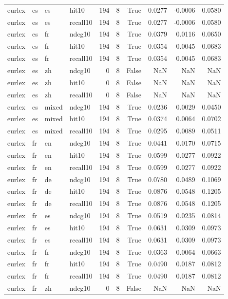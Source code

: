 \begin{tabular}{llllrrrrrr}
eurlex & es & es & hit10 & 194 & 8 & True & 0.0277 & -0.0006 & 0.0580 \\
eurlex & es & es & recall10 & 194 & 8 & True & 0.0277 & -0.0006 & 0.0580 \\
eurlex & es & fr & ndcg10 & 194 & 8 & True & 0.0379 & 0.0116 & 0.0650 \\
eurlex & es & fr & hit10 & 194 & 8 & True & 0.0354 & 0.0045 & 0.0683 \\
eurlex & es & fr & recall10 & 194 & 8 & True & 0.0354 & 0.0045 & 0.0683 \\
eurlex & es & zh & ndcg10 & 0 & 8 & False & NaN & NaN & NaN \\
eurlex & es & zh & hit10 & 0 & 8 & False & NaN & NaN & NaN \\
eurlex & es & zh & recall10 & 0 & 8 & False & NaN & NaN & NaN \\
eurlex & es & mixed & ndcg10 & 194 & 8 & True & 0.0236 & 0.0029 & 0.0450 \\
eurlex & es & mixed & hit10 & 194 & 8 & True & 0.0374 & 0.0064 & 0.0702 \\
eurlex & es & mixed & recall10 & 194 & 8 & True & 0.0295 & 0.0089 & 0.0511 \\
eurlex & fr & en & ndcg10 & 194 & 8 & True & 0.0441 & 0.0170 & 0.0715 \\
eurlex & fr & en & hit10 & 194 & 8 & True & 0.0599 & 0.0277 & 0.0922 \\
eurlex & fr & en & recall10 & 194 & 8 & True & 0.0599 & 0.0277 & 0.0922 \\
eurlex & fr & de & ndcg10 & 194 & 8 & True & 0.0780 & 0.0489 & 0.1069 \\
eurlex & fr & de & hit10 & 194 & 8 & True & 0.0876 & 0.0548 & 0.1205 \\
eurlex & fr & de & recall10 & 194 & 8 & True & 0.0876 & 0.0548 & 0.1205 \\
eurlex & fr & es & ndcg10 & 194 & 8 & True & 0.0519 & 0.0235 & 0.0814 \\
eurlex & fr & es & hit10 & 194 & 8 & True & 0.0631 & 0.0309 & 0.0973 \\
eurlex & fr & es & recall10 & 194 & 8 & True & 0.0631 & 0.0309 & 0.0973 \\
eurlex & fr & fr & ndcg10 & 194 & 8 & True & 0.0363 & 0.0064 & 0.0663 \\
eurlex & fr & fr & hit10 & 194 & 8 & True & 0.0490 & 0.0187 & 0.0812 \\
eurlex & fr & fr & recall10 & 194 & 8 & True & 0.0490 & 0.0187 & 0.0812 \\
eurlex & fr & zh & ndcg10 & 0 & 8 & False & NaN & NaN & NaN \\

\end{tabular}
